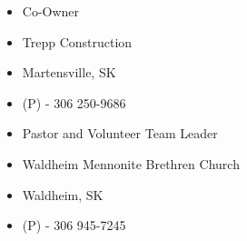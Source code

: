 \documentclass[11pt,letterpaper,sans]{moderncv}        %
\begin{document}
{
  \begin{itemize}
    \item Co-Owner
    \item Trepp Construction
    \item Martensville, SK
    \item (P) - 306 250-9686
  \end{itemize}
}

{
  \begin{itemize}
    \item Pastor and Volunteer Team Leader
    \item Waldheim Mennonite Brethren Church
    \item Waldheim, SK
    \item (P) - 306 945-7245
  \end{itemize}
}

\end{document}
